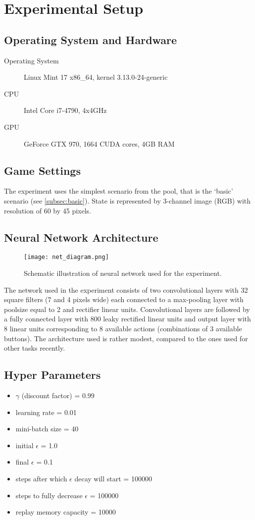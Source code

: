 \newpage
\section{Experimental Setup} 
	\subsection{Operating System and Hardware}
	\begin{description}
		\item[Operating System] Linux Mint 17 x86\_64, kernel 3.13.0-24-generic
		\item[CPU] Intel Core i7-4790, 4x4GHz
		\item[GPU] GeForce GTX 970, 1664 CUDA cores, 4GB RAM
	\end{description}

	\subsection{Game Settings}
		The experiment uses the simplest scenario from the pool, that is the `basic' scenario (see \ref{subsec:basic}). State is represented by 3-channel image (RGB) with resolution of 60 by 45 pixels.

	\subsection{Neural Network Architecture}
		\begin{figure}
			\centering
			\texttt{[image: net\_diagram.png]}
			\caption{Schematic illustration of neural network used for the experiment.}\label{fig:network}
		\end{figure}
		 The network used in the experiment consists of two convolutional layers with 32 square filters (7 and 4 pixels wide) each connected to a max-pooling layer with poolsize equal to 2 and rectifier linear units. Convolutional layers are followed by a fully connected layer with 800 leaky rectified linear units and output layer with 8 linear units corresponding to 8 available actions (combinations of 3 available buttons). The architecture used is rather modest, compared to the ones used for other tasks recently.
	
	\subsection{Hyper Parameters}
		\begin{itemize}
		\item $\gamma$ (discount factor) = 0.99
		\item learning rate = 0.01
		\item mini-batch size = 40
		\item initial $\epsilon$ = 1.0
		\item final $\epsilon$ = 0.1
		\item steps after which $\epsilon$ decay will start = 100000
		\item steps to fully decrease $\epsilon$ = 100000
		\item replay memory  capacity = 10000
		\end{itemize}
	

